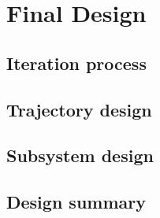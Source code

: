 \section{Final Design}\label{cha:finaldesign}

\subsection{Iteration process} \label{sec:iterationprocess}


\subsection{Trajectory design} \label{sec:trajectorydesign}


\subsection{Subsystem design} \label{sec:subsystemdesign}


\subsection{Design summary} \label{sec:designsummary}


